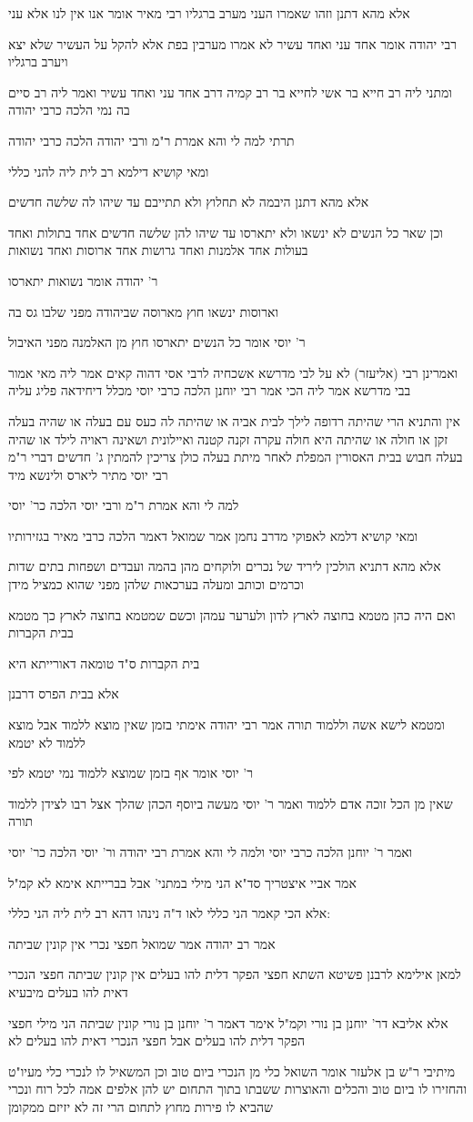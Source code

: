 \documentclass[12pt, openany]{book}
\newcommand{\sethebfont}{
\fontsize{10.5pt}{21.0pt} \selectfont
}
\newcommand{\textblock}[1]{
{\sethebfont #1\\}	
}
\begin{document}
\textblock{אלא מהא דתנן וזהו שאמרו העני מערב ברגליו רבי מאיר אומר אנו אין לנו אלא עני}
\textblock{רבי יהודה אומר אחד עני ואחד עשיר לא אמרו מערבין בפת אלא להקל על העשיר שלא יצא ויערב ברגליו}
\textblock{ומתני ליה רב חייא בר אשי לחייא בר רב קמיה דרב אחד עני ואחד עשיר ואמר ליה רב סיים בה נמי הלכה כרבי יהודה}
\textblock{תרתי למה לי והא אמרת ר"מ ורבי יהודה הלכה כרבי יהודה}
\textblock{ומאי קושיא דילמא רב לית ליה להני כללי}
\textblock{אלא מהא דתנן היבמה לא תחלוץ ולא תתייבם עד שיהו לה שלשה חדשים}
\textblock{וכן שאר כל הנשים לא ינשאו ולא יתארסו עד שיהו להן שלשה חדשים אחד בתולות ואחד בעולות אחד אלמנות ואחד גרושות אחד ארוסות ואחד נשואות}
\textblock{ר' יהודה אומר נשואות יתארסו}
\textblock{וארוסות ינשאו חוץ מארוסה שביהודה מפני שלבו גס בה}
\textblock{ר' יוסי אומר כל הנשים יתארסו חוץ מן האלמנה מפני האיבול}
\textblock{ואמרינן רבי (אליעזר) לא על לבי מדרשא אשכחיה לרבי אסי דהוה קאים אמר ליה מאי אמור בבי מדרשא אמר ליה הכי אמר רבי יוחנן הלכה כרבי יוסי מכלל דיחידאה פליג עליה}
\textblock{אין והתניא הרי שהיתה רדופה לילך לבית אביה או שהיתה לה כעס עם בעלה או שהיה בעלה זקן או חולה או שהיתה היא חולה עקרה זקנה קטנה ואיילונית ושאינה ראויה לילד או שהיה בעלה חבוש בבית האסורין המפלת לאחר מיתת בעלה כולן צריכין להמתין ג' חדשים דברי ר"מ רבי יוסי מתיר ליארס ולינשא מיד}
\textblock{למה לי והא אמרת ר"מ ורבי יוסי הלכה כר' יוסי}
\textblock{ומאי קושיא דלמא לאפוקי מדרב נחמן אמר שמואל דאמר הלכה כרבי מאיר בגזירותיו}
\textblock{אלא מהא דתניא הולכין ליריד של נכרים ולוקחים מהן בהמה ועבדים ושפחות בתים שדות וכרמים וכותב ומעלה בערכאות שלהן מפני שהוא כמציל מידן}
\textblock{ואם היה כהן מטמא בחוצה לארץ לדון ולערער עמהן וכשם שמטמא בחוצה לארץ כך מטמא בבית הקברות}
\textblock{בית הקברות ס"ד טומאה דאורייתא היא}
\textblock{אלא בבית הפרס דרבנן}
\textblock{ומטמא לישא אשה וללמוד תורה אמר רבי יהודה אימתי בזמן שאין מוצא ללמוד אבל מוצא ללמוד לא יטמא}
\textblock{ר' יוסי אומר אף בזמן שמוצא ללמוד נמי יטמא לפי}
\textblock{שאין מן הכל זוכה אדם ללמוד ואמר ר' יוסי מעשה ביוסף הכהן שהלך אצל רבו לצידן ללמוד תורה}
\textblock{ואמר ר' יוחנן הלכה כרבי יוסי ולמה לי והא אמרת רבי יהודה ור' יוסי הלכה כר' יוסי}
\textblock{אמר אביי איצטריך סד"א הני מילי במתני' אבל בברייתא אימא לא קמ"ל}
\textblock{אלא הכי קאמר הני כללי לאו ד"ה נינהו דהא רב לית ליה הני כללי:}
\textblock{אמר רב יהודה אמר שמואל חפצי נכרי אין קונין שביתה}
\textblock{למאן אילימא לרבנן פשיטא השתא חפצי הפקר דלית להו בעלים אין קונין שביתה חפצי הנכרי דאית להו בעלים מיבעיא}
\textblock{אלא אליבא דר' יוחנן בן נורי וקמ"ל אימר דאמר ר' יוחנן בן נורי קונין שביתה הני מילי חפצי הפקר דלית להו בעלים אבל חפצי הנכרי דאית להו בעלים לא}
\textblock{מיתיבי ר"ש בן אלעזר אומר השואל כלי מן הנכרי ביום טוב וכן המשאיל לו לנכרי כלי מעיו"ט והחזירו לו ביום טוב והכלים והאוצרות ששבתו בתוך התחום יש להן אלפים אמה לכל רוח ונכרי שהביא לו פירות מחוץ לתחום הרי זה לא יזיזם ממקומן}
\end{document}
